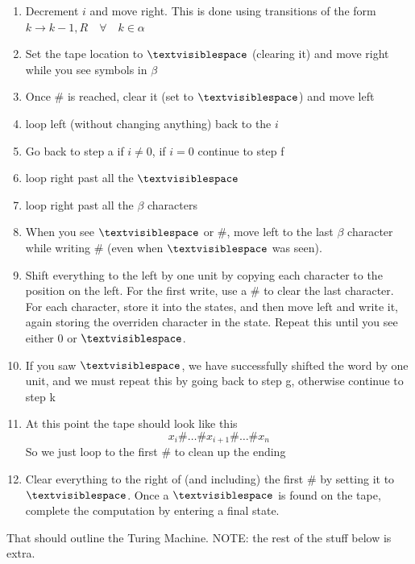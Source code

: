 \documentclass[11pt]{article}
\begin{document}
\begin{enumerate}
    \begin{enumerate}
        \item Decrement $i$ and move right. This is done using transitions of the form $k \rightarrow k-1, R \quad \forall \quad k \in \alpha$
        \item Set the tape location to $\textvisiblespace$ (clearing it) and move right while you see symbols in $\beta$
        \item Once $\#$ is reached, clear it (set to $\textvisiblespace$) and move left
        \item loop left (without changing anything) back to the $i$
        \item Go back to step a if $i \neq 0$, if $i = 0$ continue to step f
        \item loop right past all the $\textvisiblespace$
        \item loop right past all the $\beta$ characters
        \item When you see $\textvisiblespace$ or $\#$, move left to the last $\beta$ character while writing $\#$ (even when $\textvisiblespace$ was seen).
        \item Shift everything to the left by one unit by copying each character to the position on the left. For the first write, use a $\#$ to clear the last character. For each character, store it into the states, and then move left and write it, again storing the overriden character in the state. Repeat this until you see either $0$ or $\textvisiblespace$.
        \item If you saw $\textvisiblespace$, we have successfully shifted the word by one unit, and we must repeat this by going back to step g, otherwise continue to step k
        \item At this point the tape should look like this
            $$x_i\#\dots\#x_{i+1}\#\dots\#x_n$$
        So we just loop to the first $\#$ to clean up the ending
        \item Clear everything to the right of (and including) the first $\#$ by setting it to $\textvisiblespace$. Once a $\textvisiblespace$ is found on the tape, complete the computation by entering a final state.
    \end{enumerate}

    That should outline the Turing Machine. NOTE: the rest of the stuff below is extra.


\end{enumerate}
\end{document}
